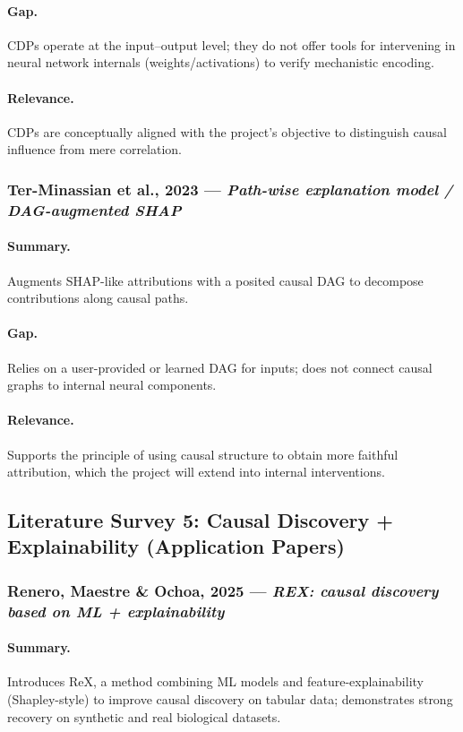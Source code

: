 \documentclass[12pt,singleside,a4paper]{article}
\begin{document}
\paragraph{Gap.}
CDPs operate at the input–output level; they do not offer tools for intervening in neural network internals (weights/activations) to verify mechanistic encoding.  
\paragraph{Relevance.}
CDPs are conceptually aligned with the project’s objective to distinguish causal influence from mere correlation. 

\subsubsection{Ter-Minassian et al., 2023 — \textit{Path-wise explanation model / DAG-augmented SHAP}}
\paragraph{Summary.}
Augments SHAP-like attributions with a posited causal DAG to decompose contributions along causal paths.  
\paragraph{Gap.}
Relies on a user-provided or learned DAG for inputs; does not connect causal graphs to internal neural components.  
\paragraph{Relevance.}
Supports the principle of using causal structure to obtain more faithful attribution, which the project will extend into internal interventions. 

\subsection{Literature Survey 5: Causal Discovery + Explainability (Application Papers)}

\subsubsection{Renero, Maestre \& Ochoa, 2025 — \textit{REX: causal discovery based on ML + explainability}}
\paragraph{Summary.}
Introduces ReX, a method combining ML models and feature-explainability (Shapley-style) to improve causal discovery on tabular data; demonstrates strong recovery on synthetic and real biological datasets.  
\end{document}
